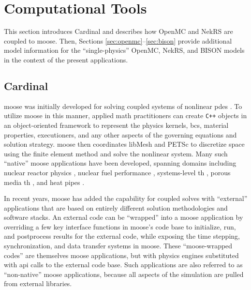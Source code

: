 \documentclass[3p,,preprint,11pt]{elsarticle}
\begin{document}
\section{Computational Tools}
\label{sec:tools}

This section introduces Cardinal and describes how OpenMC and NekRS are coupled to \gls{moose}. Then, Sections \ref{sec:openmc}--\ref{sec:bison} provide additional model information for the ``single-physics'' OpenMC, NekRS, and BISON models in the context of the present applications.

\subsection{Cardinal}
\label{sec:cardinal}

\gls{moose} was initially developed for solving coupled systems of nonlinear \glspl{pde} \cite{moose2020}. To utilize \gls{moose} in this manner, applied math practitioners can create {\tt C++} objects in an object-oriented framework to represent the physics kernels, \glspl{bc}, material properties, executioners, and any other aspects of the governing equations and solution strategy. \gls{moose} then coordinates libMesh and PETSc to discretize space using the finite element method and solve the nonlinear system. Many such ``native'' \gls{moose} applications have been developed, spanning domains including nuclear reactor physics \cite{rattlesnake}, nuclear fuel performance \cite{bison}, systems-level \gls{th} \cite{hu}, porous media \gls{th} \cite{novak2021b}, and heat pipes \cite{sockeye}. 

In recent years, \gls{moose} has added the capability for coupled solves with ``external'' applications that are based on entirely different solution methodologies and software stacks. An external code can be ``wrapped'' into a \gls{moose} application by overriding a few key interface functions in \gls{moose}'s code base to initialize, run, and postprocess results for the external code, while exposing the time stepping, synchronization, and data transfer systems in \gls{moose}. These ``\gls{moose}-wrapped codes'' are themselves \gls{moose} applications, but with physics engines substituted with \gls{api} calls to the external code base. Such applications are also referred to as ``non-native'' \gls{moose} applications, because all aspects of the simulation are pulled from external libraries.
\end{document}
